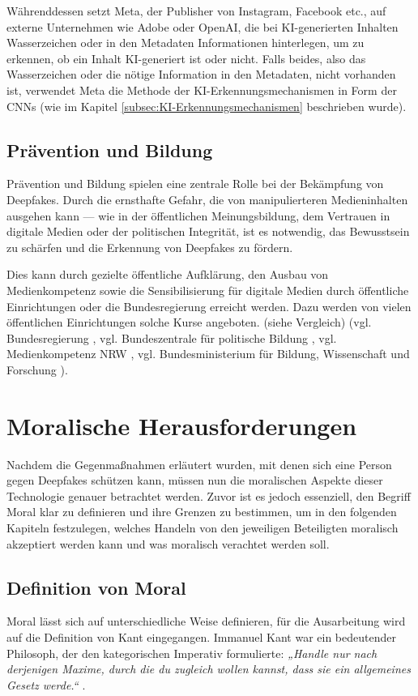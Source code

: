 \documentclass[a4paper,12pt]{article}
\begin{document}
Währenddessen setzt Meta, der Publisher von Instagram, Facebook etc., auf externe Unternehmen wie Adobe oder OpenAI, 
die bei KI-generierten Inhalten Wasserzeichen oder in den Metadaten Informationen hinterlegen, um zu erkennen, 
ob ein Inhalt KI-generiert ist oder nicht. Falls beides, also das Wasserzeichen oder die nötige Information in den Metadaten, nicht vorhanden ist, 
verwendet Meta die Methode der KI-Erkennungsmechanismen in Form der CNNs (wie im Kapitel \ref{subsec:KI-Erkennungsmechanismen} beschrieben wurde). \cite{TheVerge2024b} \cite{Meta2024}

\subsection{Prävention und Bildung}
Prävention und Bildung spielen eine zentrale Rolle bei der Bekämpfung von Deepfakes. 
Durch die ernsthafte Gefahr, die von manipulierteren Medieninhalten ausgehen kann — wie in der öffentlichen Meinungsbildung, 
dem Vertrauen in digitale Medien oder der politischen Integrität, ist es notwendig, 
das Bewusstsein zu schärfen und die Erkennung von Deepfakes zu fördern.  

Dies kann durch gezielte öffentliche Aufklärung, den Ausbau von Medienkompetenz sowie die Sensibilisierung für digitale Medien durch öffentliche Einrichtungen oder die Bundesregierung erreicht werden. 
Dazu werden von vielen öffentlichen Einrichtungen solche Kurse angeboten. (siehe Vergleich)
 (vgl. Bundesregierung \cite{Bundesregierung2024}, vgl. Bundeszentrale für politische Bildung \cite{BPB2024}, 
 vgl. Medienkompetenz NRW \cite{Medienkompetenz2024}, vgl. Bundesministerium für Bildung, Wissenschaft und Forschung \cite{Erwachsenenbildung2024}).

\newpage

\section{Moralische Herausforderungen}
Nachdem die Gegenmaßnahmen erläutert wurden, mit denen sich eine Person gegen Deepfakes schützen kann, 
müssen nun die moralischen Aspekte dieser Technologie genauer betrachtet werden. 
Zuvor ist es jedoch essenziell, den Begriff Moral klar zu definieren und ihre Grenzen zu bestimmen, 
um in den folgenden Kapiteln festzulegen, welches Handeln von den jeweiligen Beteiligten moralisch akzeptiert werden kann und was moralisch verachtet werden soll.

\subsection{Definition von Moral}
Moral lässt sich auf unterschiedliche Weise definieren, für die Ausarbeitung wird auf die Definition von Kant eingegangen. 
Immanuel Kant war ein bedeutender Philosoph, der den kategorischen Imperativ formulierte: \textit{„Handle nur nach derjenigen Maxime, durch die du zugleich wollen kannst, dass sie ein allgemeines Gesetz werde.“} \cite{KantMetaphysik}.
\end{document}

